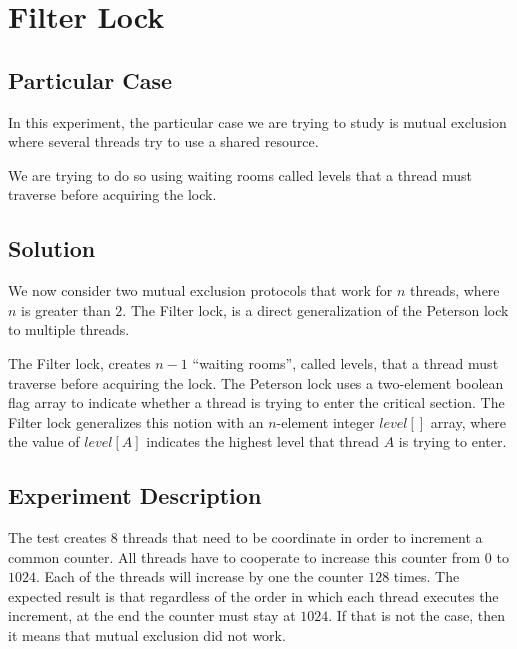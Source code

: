 


\section{\textbf{Filter Lock}}



\subsection{Particular Case}
\par
In this experiment, the particular case we are trying to study is mutual exclusion where several threads try to use a shared resource.
\par
We are trying to do so using waiting rooms called levels that a thread must traverse before acquiring the lock.
\par



\subsection{Solution}
\par
We now consider two mutual exclusion protocols that work for $n$ threads, where $n$ is greater than $2$. The Filter lock, is a direct generalization of the Peterson lock to multiple threads.
\par
The Filter lock, creates \(n - 1\) ``waiting rooms'', called levels, that a thread must traverse before acquiring the lock. The Peterson lock uses a two-element boolean flag array to indicate whether a thread is trying to enter the critical section. The Filter lock generalizes this notion with an $n$-element integer $level[]$ array, where the value of $level[A]$ indicates the highest level that thread $A$ is trying to enter. 
\par



\subsection{Experiment Description} 
\par
The test creates $8$ threads that need to be coordinate in order to increment a common counter. All threads have to cooperate to increase this counter from 0 to $1024$. Each of the threads will increase by one the counter $128$ times.
The expected result is that regardless of the order in which each thread executes the increment, at the end the counter must stay at $1024$.
If that is not the case, then it means that mutual exclusion did not work.
\par


